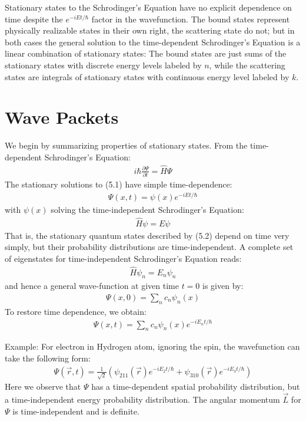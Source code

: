 \documentclass[11pt]{book}
\theoremstyle{break}
\theoremstyle{break}
\newcommand{\pd}{\partial}
\newcommand{\example}{\color{green}Example: \color{black}}
\begin{document}
Stationary states to the Schrodinger's Equation have no explicit dependence on time despite the $e^{-iEt/\hbar}$ factor in the wavefunction. The bound states represent physically realizable states in their own right, the scattering state do not; but in both cases the general solution to the time-dependent Schrodinger's Equation is a linear combination of stationary states: The bound states are just sums of the stationary states with discrete energy levels labeled by $n$, while the scattering states are integrals of stationary states with continuous energy level labeled by $k$.\\

\newpage
\section[Wave Packets]{\color{red}Wave Packets\color{black}}
We begin by summarizing properties of stationary states. From the time-dependent Schrodinger's Equation:
\begin{align}
i\hbar \frac{\pd \Psi}{\pd t} = \hat{H}\Psi
\end{align}
The stationary solutions to (5.1) have simple time-dependence:
\begin{align}
\Psi(x,t) = \psi(x) e^{-iEt/\hbar}
\end{align}
with $\psi(x)$ solving the time-independent Schrodinger's Equation:
\begin{align}
\hat{H}\psi = E\psi
\end{align}
That is, the stationary quantum states
described by (5.2) depend on time very simply, but their probability distributions are time-independent. A complete set of eigenstates for time-independent Schrodinger's Equation reads:
\begin{align*}
\hat{H}\psi_n = E_n \psi_n
\end{align*}
and hence a general wave-function at given time $t =0$ is given by:
\begin{align*}
\Psi(x,0) = \sum_n c_n \psi_n (x)
\end{align*}
To restore time dependence, we obtain:
\begin{align*}
\Psi(x,t) = \sum_n c_n \psi_n(x) e^{-iE_nt/\hbar}
\end{align*}

\example For electron in Hydrogen atom, ignoring the spin, the wavefunction can take the following form:
\begin{align*}
\Psi(\vec{r},t) = \frac{1}{\sqrt{2}} \left( \psi_{211}(\vec{r})e^{-iE_2t/\hbar} + \psi_{310}(\vec{r})e^{-iE_3t/\hbar}\right)
\end{align*}
Here we observe that $\Psi$ has a time-dependent spatial probability distribution, but a time-independent energy probability distribution. The angular momentum $\vec{L}$ for $\Psi$ is time-independent and is definite. \\
\end{document}
